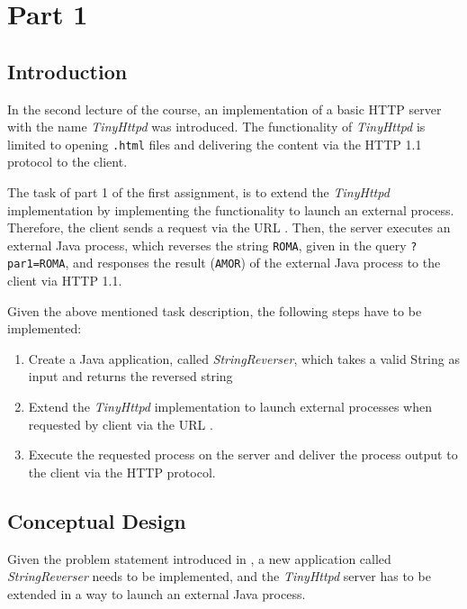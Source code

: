 \section{Part 1}\label{sec:01_part1}

\subsection{Introduction}\label{subsec:01_part1_intro}
In the second lecture of the course, an implementation of a basic HTTP server with the name \textit{TinyHttpd} was introduced.
The functionality of \textit{TinyHttpd} is limited to opening \texttt{.html} files and delivering the content via the HTTP 1.1 protocol to the client.


The task of part 1 of the first assignment, is to extend the \textit{TinyHttpd} implementation by implementing the functionality to launch an external process. Therefore, the client sends a request via the URL . Then, the server executes an external Java process, which reverses the string \texttt{ROMA}, given in the query \texttt{?par1=ROMA}, and responses the result (\texttt{AMOR}) of the external Java process to the client via HTTP 1.1.


Given the above mentioned task description, the following steps have to be implemented:
\begin{enumerate}
\item Create a Java application, called \textit{StringReverser}, which takes a valid String as input and returns the reversed string
\item Extend the \textit{TinyHttpd} implementation to launch external processes when requested by client via the URL .
\item Execute the requested process on the server and deliver the process output to the client via the HTTP protocol.
\end{enumerate}


\newpage
\subsection{Conceptual Design}\label{subsec:01_part1_design}
Given the problem statement introduced in , a new application called \textit{StringReverser} needs to be implemented, and the \textit{TinyHttpd} server has to be extended in a way to launch an external Java process.

